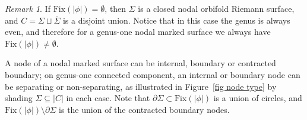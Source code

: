 \documentclass[11pt]{amsart}
\theoremstyle{definition}
\theoremstyle{remark}
\newtheorem{rmk}[dummy]{Remark}
\newcommand{\<}{\left<}
\renewcommand{\>}{\right>}
\numberwithin{equation}{section}
\begin{document}
\begin{rmk}
    If $\text{Fix}(|\phi|)=\emptyset$, then $\Sigma$ is a closed nodal orbifold Riemann surface, and $C=\Sigma \sqcup \overline{\Sigma}$ is a disjoint union. Notice that in this case the genus is always even, and therefore for a genus-one nodal marked surface we always have $\text{Fix}(|\phi|)\ne \emptyset$.
\end{rmk}




A node of a nodal marked surface can be %
internal, boundary or %
contracted %
boundary; on genus-one connected %
component, an internal or boundary node can be separating or non-separating, as illustrated in Figure~\ref{fig node type} by shading $\Sigma \subseteq |C|$ in each case.  Note that ${\partial}\Sigma\subset\text{Fix}(|\phi|)$ is a union of circles, and $\text{Fix}(|\phi|)\setminus{\partial}\Sigma$ is the union of the contracted boundary %
nodes.
\end{document}
